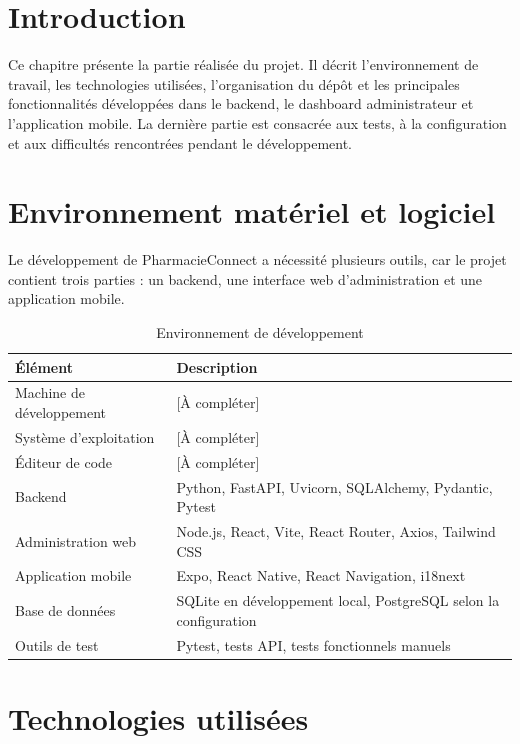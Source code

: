 \section{Introduction}

Ce chapitre présente la partie réalisée du projet. Il décrit l'environnement de travail, les technologies
utilisées, l'organisation du dépôt et les principales fonctionnalités développées dans le backend, le
dashboard administrateur et l'application mobile. La dernière partie est consacrée aux tests, à la
configuration et aux difficultés rencontrées pendant le développement.

\section{Environnement matériel et logiciel}

Le développement de PharmacieConnect a nécessité plusieurs outils, car le projet contient trois parties :
un backend, une interface web d'administration et une application mobile.

\begin{table}[H]
    \centering
    \caption{Environnement de développement}
    \begin{tabular}{L{5cm}L{8cm}}
        \toprule
        \textbf{Élément} & \textbf{Description} \\
        \midrule
        Machine de développement & [À compléter] \\
        Système d'exploitation & [À compléter] \\
        Éditeur de code & [À compléter] \\
        Backend & Python, FastAPI, Uvicorn, SQLAlchemy, Pydantic, Pytest \\
        Administration web & Node.js, React, Vite, React Router, Axios, Tailwind CSS \\
        Application mobile & Expo, React Native, React Navigation, i18next \\
        Base de données & SQLite en développement local, PostgreSQL selon la configuration \\
        Outils de test & Pytest, tests API, tests fonctionnels manuels \\
        \bottomrule
    \end{tabular}
\end{table}

\section{Technologies utilisées}

